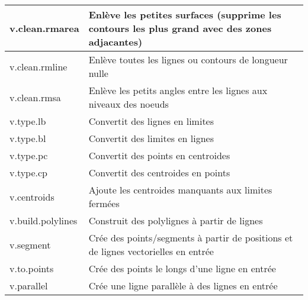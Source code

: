 \begin{table}[H]
{\begin{longtable}{|p{2.5cm}|p{11.5cm}|}
  \hline v.clean.rmarea & Enlève les petites surfaces (supprime les contours les plus grand avec des zones adjacantes) \\
  \hline v.clean.rmline & Enlève toutes les lignes ou contours de longueur nulle\\
  \hline v.clean.rmsa & Enlève les petits angles entre les lignes aux niveaux des noeuds\\
  \hline v.type.lb & Convertit des lignes en limites\\
  \hline v.type.bl & Convertit des limites en lignes\\
  \hline v.type.pc & Convertit des points en centroides \\
  \hline v.type.cp & Convertit des centroides en points \\
  \hline v.centroids & Ajoute les centroides manquants aux limites fermées\\
  \hline v.build.polylines & Construit des polylignes à partir de lignes\\
  \hline v.segment & Crée des points/segments à partir de positions et de lignes vectorielles en entrée\\
  \hline v.to.points & Crée des points le longs d'une ligne en entrée\\
  \hline v.parallel & Crée une ligne parallèle à des lignes en entrée\\

\end{longtable}}
\end{table}
